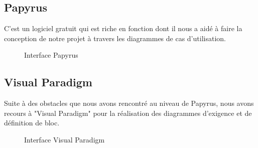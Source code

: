 	\subsection{Papyrus}
	C'est un logiciel gratuit qui est riche en fonction dont il nous a aidé à faire la conception de notre projet à travers les diagrammes de cas d'utilisation.
	\begin{figure}[H]
		\begin{center}
			\centering
		\end{center}
		\caption{Interface Papyrus}
	\end{figure}

	\subsection{Visual Paradigm}
	Suite à des obstacles que nous avons rencontré au niveau de Papyrus, nous avons recours à "Visual Paradigm" pour la réalisation des diagrammes d'exigence et de définition de bloc.
	\begin{figure}[H]
		\begin{center}
			\centering
		\end{center}
		\caption{Interface Visual Paradigm}
	\end{figure}
